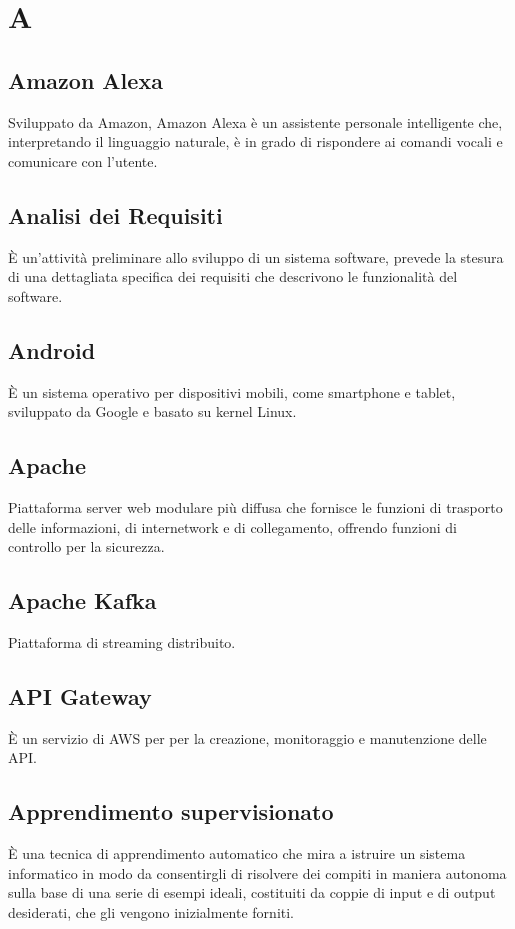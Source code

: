 \section*{A}

\subsection{Amazon Alexa}
Sviluppato da Amazon, Amazon Alexa è un assistente personale intelligente che, interpretando il linguaggio naturale, è in grado di rispondere ai comandi vocali e comunicare con l'utente. 

\subsection{Analisi dei Requisiti}
È un'attività preliminare allo sviluppo di un sistema software, prevede la stesura di una dettagliata specifica dei requisiti che descrivono le funzionalità del software.

\subsection{Android}
È un sistema operativo per dispositivi mobili, come smartphone e tablet, sviluppato da Google e basato su kernel Linux.

\subsection{Apache}
Piattaforma server web modulare più diffusa che fornisce le funzioni di trasporto delle informazioni, di internetwork e di collegamento, offrendo funzioni di controllo per la sicurezza.

\subsection{Apache Kafka}
Piattaforma di streaming distribuito.

\subsection{API Gateway}
È un servizio di AWS per per la creazione, monitoraggio e manutenzione delle API.

\subsection{Apprendimento supervisionato}
È una tecnica di apprendimento automatico che mira a istruire un sistema informatico in modo da consentirgli di risolvere dei compiti in maniera autonoma sulla base di una serie di esempi ideali, costituiti da coppie di input e di output desiderati, che gli vengono inizialmente forniti.


